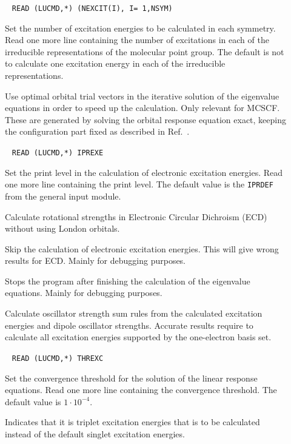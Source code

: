 \begin{description}
\item[]\verb| |\newline
\verb|READ (LUCMD,*) (NEXCIT(I), I= 1,NSYM)|

Set the number of excitation energies to be
calculated in each
symmetry. Read one more line containing the number of excitations in
each of the irreducible representations of the molecular point group.
The default is not to calculate one excitation energy in each of the
irreducible representations.

\item[] Use optimal orbital trial vectors in the
iterative solution of the eigenvalue equations
in order to speed up the calculation.
Only relevant for MCSCF.
These are generated by solving the orbital response equation
exact, keeping the configuration part fixed as described in
Ref.~\cite{tuhjahjajpjjcp84}.

\item[]\verb| |\newline
\verb|READ (LUCMD,*) IPREXE|

Set the print level in the calculation of electronic excitation
energies. Read one more line containing the print level.
The default value is the \verb|IPRDEF| from the general input module.

\item[] Calculate rotational strengths in Electronic
Circular Dichroism (ECD) without using London orbitals.

\item[] Skip the calculation of electronic excitation
energies. This will give wrong results for ECD.
Mainly for debugging purposes.

\item[] Stops the program after finishing the
calculation of the eigenvalue equations.
Mainly for debugging purposes.

\item[] Calculate oscillator strength sum rules from
the calculated excitation energies and dipole oscillator strengths.
Accurate results require to calculate all excitation energies supported
by the one-electron basis set.

\item[]\verb| |\newline
\verb|READ (LUCMD,*) THREXC|

Set the convergence threshold for the solution
of the linear response equations. Read one more line
containing the convergence threshold. The default value is
$1\cdot10^{-4}$.

\item[]
Indicates that it is triplet excitation energies that is to be
calculated instead of the default singlet excitation energies.
\end{description}

